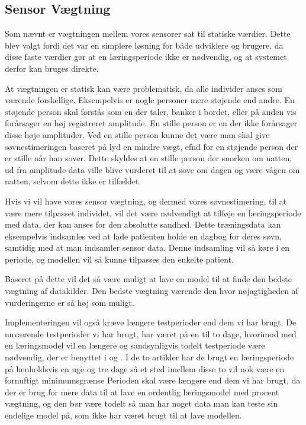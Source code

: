 \subsection{Sensor Vægtning}\label{subsec:sensorvaegtsoevn}
Som nævnt er vægtningen mellem vores sensorer sat til statiske værdier.
Dette blev valgt fordi det var en simplere løsning for både udviklere og brugere, da disse faste værdier gør at en læringsperiode ikke er nødvendig, og at systemet derfor kan bruges direkte.

At vægtningen er statisk kan være problematisk, da alle individer anses som værende forskellige. 
Eksempelvis er nogle personer mere støjende end andre.
En støjende person skal forstås som en der taler, banker i bordet, eller på anden vis forårsager en høj registreret amplitude.
En stille person er en der ikke forårsager disse høje amplituder.
Ved en stille person kunne det være man skal give søvn\-estimeringen baseret på lyd en mindre vægt, efnd for en støjende person der er stille når han sover.
Dette skyldes at en stille person der snorken om natten, ud fra amplitude-data ville blive vurderet til at sove om dagen og være vågen om natten, selvom dette ikke er tilfældet.

Hvis vi vil have vores sensor vægtning, og dermed vores søvn\-estimering, til at være mere tilpasset individet, vil det være nødvendigt at tilføje en læringsperiode med data, der kan anses for den absolutte sandhed.
Dette træningsdata kan eksempelvis indsamles ved at lade patienten holde en dagbog for deres søvn, samtidig med at man indsamler sensor data.
Denne indsamling vil så køre i en periode, og modellen vil så kunne tilpasses den enkelte patient.

Baseret på dette vil det så være muligt at lave en model til at finde den bedste vægtning af datakilder.
Den bedste vægtning værende den hvor nøjagtigheden af vurderingerne er så høj som muligt.

Implementeringen vil også kræve længere testperioder end dem vi har brugt.
De nuværende testperioder vi har brugt, har været på en til to dage, hvorimod med en læringsmodel vil en længere og sandsynligvis todelt testperiode være nødvendig, der er benyttet i \citet{6563918} og \citet{Min:2014:TNT:2556288.2557220}.
I de to artikler har de brugt en læringsperiode på henholdsvis en uge og tre dage så et sted imellem disse to vil nok være en fornuftigt minimumsgrænse
Perioden skal være længere end dem vi har brugt, da der er brug for mere data til at lave en ordentlig læringsmodel med procent vægtning, og den bør være todelt så man har noget data man kan teste sin endelige model på, som ikke har været brugt til at lave modellen.
